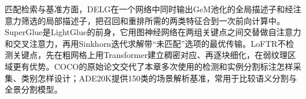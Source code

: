 匹配检索与基准方面，DELG在一个网络中同时输出GeM池化的全局描述子和经注意力筛选的局部描述子，把召回和重排所需的两类特征合到一次前向计算中。SuperGlue是LightGlue的前身，它用图神经网络在两组关键点之间交替做自注意力和交叉注意力，再用Sinkhorn迭代求解带“未匹配”选项的最优传输。LoFTR不检测关键点，先在粗网格上用Transformer建立稠密对应、再逐块细化，在弱纹理区域更有优势。COCO的原始论文交代了本章多次使用的检测和实例分割标注怎样采集、类别怎样设计；ADE20K提供150类的场景解析基准，常用于比较语义分割与全景分割模型。
